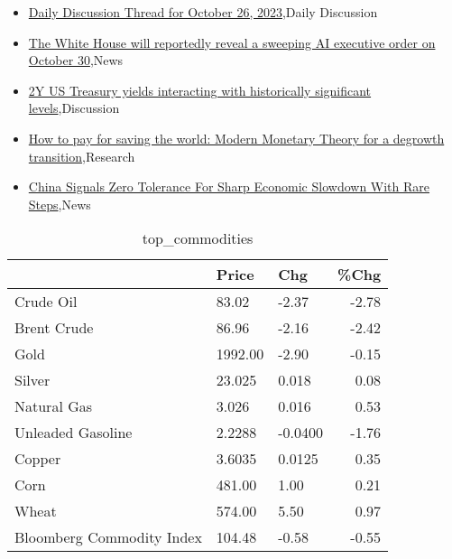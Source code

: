 \documentclass{article}%
\begin{document}
%
\begin{itemize}%
\item%
\href{https://reddit.com/r/wallstreetbets/comments/17gszqi/daily\_discussion\_thread\_for\_october\_26\_2023/}{Daily Discussion Thread for October 26, 2023},Daily Discussion%
\item%
\href{https://reddit.com/r/wallstreetbets/comments/17gs0gd/the\_white\_house\_will\_reportedly\_reveal\_a\_sweeping/}{The White House will reportedly reveal a sweeping AI executive order on October 30},News%
\item%
\href{https://reddit.com/r/StockMarket/comments/17fdpje/2y\_us\_treasury\_yields\_interacting\_with/}{2Y US Treasury yields interacting with historically significant levels},Discussion%
\item%
\href{https://reddit.com/r/Economics/comments/17g2sd0/how\_to\_pay\_for\_saving\_the\_world\_modern\_monetary/}{How to pay for saving the world: Modern Monetary Theory for a degrowth transition},Research%
\item%
\href{https://reddit.com/r/Economics/comments/17g0h9b/china\_signals\_zero\_tolerance\_for\_sharp\_economic/}{China Signals Zero Tolerance For Sharp Economic Slowdown With Rare Steps},News%
\end{itemize}%


\begin{table}[htbp]%
\caption{top\_commodities}%
\centering%
\begin{adjustbox}{width=1\textwidth}%
\begin{tabular}{lllr}
\toprule
                          &   Price &     Chg &  \%Chg \\
\midrule
               Crude Oil  &   83.02 &   -2.37 & -2.78 \\
             Brent Crude  &   86.96 &   -2.16 & -2.42 \\
                    Gold  & 1992.00 &   -2.90 & -0.15 \\
                  Silver  &  23.025 &   0.018 &  0.08 \\
             Natural Gas  &   3.026 &   0.016 &  0.53 \\
       Unleaded Gasoline  &  2.2288 & -0.0400 & -1.76 \\
                  Copper  &  3.6035 &  0.0125 &  0.35 \\
                    Corn  &  481.00 &    1.00 &  0.21 \\
                   Wheat  &  574.00 &    5.50 &  0.97 \\
Bloomberg Commodity Index &  104.48 &   -0.58 & -0.55 \\
\bottomrule
\end{tabular}
%
\end{adjustbox}%
\end{table}
\end{document}
